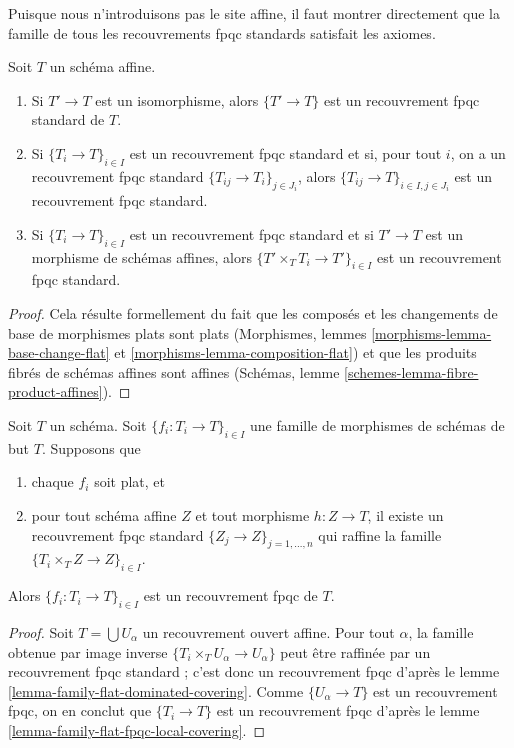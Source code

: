 \noindent
Puisque nous n'introduisons pas le site affine, il faut montrer directement
que la famille de tous les recouvrements fpqc standards satisfait les
axiomes.

\begin{lemma}
\label{lemma-fpqc-affine-axioms}
Soit $T$ un schéma affine.
\begin{enumerate}
\item Si $T' \to T$ est un isomorphisme, alors $\{T' \to T\}$
est un recouvrement fpqc standard de $T$.
\item Si $\{T_i \to T\}_{i\in I}$ est un recouvrement fpqc standard et si, pour tout
$i$, on a un recouvrement fpqc standard $\{T_{ij} \to T_i\}_{j\in J_i}$, alors
$\{T_{ij} \to T\}_{i \in I, j\in J_i}$ est un recouvrement fpqc standard.
\item Si $\{T_i \to T\}_{i\in I}$ est un recouvrement fpqc standard
et si $T' \to T$ est un morphisme de schémas affines, alors
$\{T' \times_T T_i \to T'\}_{i\in I}$ est un recouvrement fpqc standard.
\end{enumerate}
\end{lemma}

\begin{proof}
Cela résulte formellement du fait que les composés et les changements de base
de morphismes plats sont plats
(Morphismes, lemmes \ref{morphisms-lemma-base-change-flat} et
\ref{morphisms-lemma-composition-flat})
et que les produits fibrés de schémas affines sont affines
(Schémas, lemme \ref{schemes-lemma-fibre-product-affines}).
\end{proof}

\begin{lemma}
\label{lemma-fpqc-covering-affines-mapping-in}
Soit $T$ un schéma. Soit $\{f_i : T_i \to T\}_{i \in I}$ une famille de
morphismes de schémas de but $T$. Supposons que
\begin{enumerate}
\item chaque $f_i$ soit plat, et
\item pour tout schéma affine
$Z$ et tout morphisme $h : Z \to T$, il existe un recouvrement fpqc standard
$\{Z_j \to Z\}_{j = 1, \ldots, n}$ qui raffine la famille
$\{T_i \times_T Z \to Z\}_{i \in I}$.
\end{enumerate}
Alors $\{f_i : T_i \to T\}_{i \in I}$ est un recouvrement fpqc de $T$.
\end{lemma}

\begin{proof}
Soit $T = \bigcup U_\alpha$ un recouvrement ouvert affine.
Pour tout $\alpha$, la famille obtenue par image inverse $\{T_i \times_T U_\alpha \to U_\alpha\}$
peut être raffinée par un recouvrement fpqc standard ; c'est donc un
recouvrement fpqc d'après le lemme
\ref{lemma-family-flat-dominated-covering}.
Comme $\{U_\alpha \to T\}$ est un recouvrement fpqc, on en conclut que
$\{T_i \to T\}$ est un recouvrement fpqc d'après le
lemme \ref{lemma-family-flat-fpqc-local-covering}.
\end{proof}

